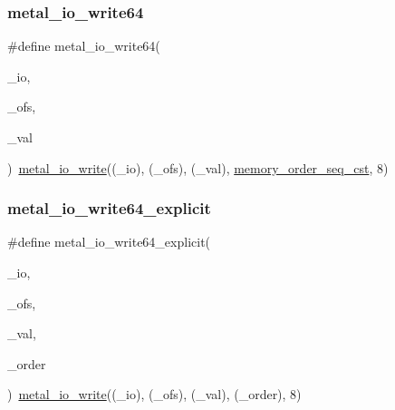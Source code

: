 \subsubsection{\texorpdfstring{metal\+\_\+io\+\_\+write64}{metal\_io\_write64}}
{\footnotesize\ttfamily \#define metal\+\_\+io\+\_\+write64(\begin{DoxyParamCaption}\item[{}]{\+\_\+io,  }\item[{}]{\+\_\+ofs,  }\item[{}]{\+\_\+val }\end{DoxyParamCaption})~\hyperlink{group__io_ga74ef56cd9b16bced8c2b8553956220b4}{metal\+\_\+io\+\_\+write}((\+\_\+io), (\+\_\+ofs), (\+\_\+val), \hyperlink{compiler_2gcc_2atomic_8h_a17c2de5ae768960284c047a320f17d1ba2d21914d1edd227a890107e7878a3752}{memory\+\_\+order\+\_\+seq\+\_\+cst}, 8)}

\mbox{\label{group__io_ga84eb7098e98bde8c21f31839e86116f2}} 
\subsubsection{\texorpdfstring{metal\+\_\+io\+\_\+write64\+\_\+explicit}{metal\_io\_write64\_explicit}}
{\footnotesize\ttfamily \#define metal\+\_\+io\+\_\+write64\+\_\+explicit(\begin{DoxyParamCaption}\item[{}]{\+\_\+io,  }\item[{}]{\+\_\+ofs,  }\item[{}]{\+\_\+val,  }\item[{}]{\+\_\+order }\end{DoxyParamCaption})~\hyperlink{group__io_ga74ef56cd9b16bced8c2b8553956220b4}{metal\+\_\+io\+\_\+write}((\+\_\+io), (\+\_\+ofs), (\+\_\+val), (\+\_\+order), 8)}

\mbox{\label{group__io_ga6f3f1fad31b9a01994df68237ccf4a9c}} 
